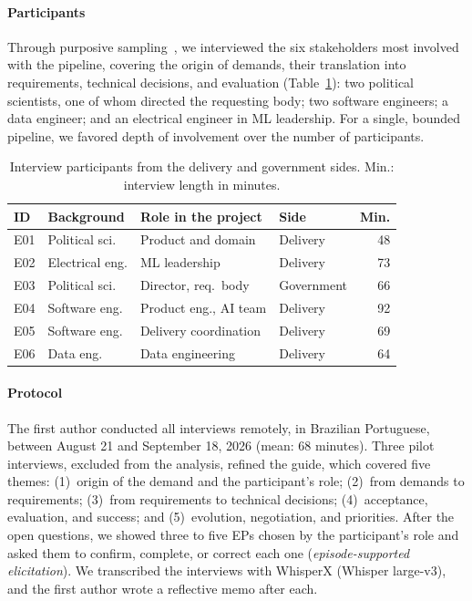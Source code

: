 \documentclass[sigconf,nonacm]{acmart}
\newif\ifshownotes
\newcommand{\gnote}[1]{\ifshownotes{\color{blue}\textbf{[G:} #1\textbf{]}}\fi}
\newcommand{\rnote}[1]{\ifshownotes{\color{red}\textbf{[R:} #1\textbf{]}}\fi}
\newcommand{\isnote}[1]{\ifshownotes{\color{purple}\textbf{[IS:} #1\textbf{]}}\fi}
\begin{document}
\paragraph{Participants}
Through purposive sampling~\cite{runeson2009}, we interviewed the six stakeholders most involved with the pipeline, covering the origin of demands, their translation into requirements, technical decisions, and evaluation (Table~\ref{tab:participants}): two political scientists, one of whom directed the requesting body; two software engineers; a data engineer; and an electrical engineer in ML leadership. For a single, bounded pipeline, we favored depth of involvement over the number of participants.


\begin{table}[t]
\centering
\caption{Interview participants from the delivery and government sides. Min.: interview length in minutes.}
\label{tab:participants}
\footnotesize
\setlength{\tabcolsep}{5pt}
\begin{tabular}{@{}llllr@{}}
\hline
\textbf{ID} & \textbf{Background} & \textbf{Role in the project} & \textbf{Side} & \textbf{Min.} \\
\hline
E01 & Political sci. & Product and domain & Delivery & 48 \\
E02 & Electrical eng. & ML leadership & Delivery & 73 \\
E03 & Political sci. & Director, req.\ body & Government & 66 \\
E04 & Software eng. & Product eng., AI team & Delivery & 92 \\
E05 & Software eng. & Delivery coordination & Delivery & 69 \\
E06 & Data eng. & Data engineering & Delivery & 64 \\
\hline
\end{tabular}
\end{table}

\paragraph{Protocol}
The first author conducted all interviews remotely, in Brazilian Portuguese, between August 21 and September 18, 2026 (mean: 68 minutes). Three pilot interviews, excluded from the analysis, refined the guide, which covered five themes: (1)~origin of the demand and the participant's role; (2)~from demands to requirements; (3)~from requirements to technical decisions; (4)~acceptance, evaluation, and success; and (5)~evolution, negotiation, and priorities. After the open questions, we showed three to five EPs chosen by the participant's role and asked them to confirm, complete, or correct each one (\emph{episode-supported elicitation}). We transcribed the interviews with WhisperX (Whisper large-v3), and the first author wrote a reflective memo after each.
\end{document}
